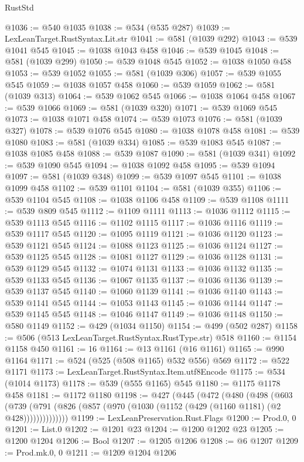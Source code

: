 \begin{lexlean}{RustStd}
\begin{coremodule}
@1036 := @540 @1035
@1038 := @534 (@535 @287)
@1039 := LexLeanTarget.RustSyntax.Lit.str
@1041 := @581 (@1039 @292)
@1043 := @539 @1041 @545
@1045 := @1038 @1043 @458
@1046 := @539 @1045
@1048 := @581 (@1039 @299)
@1050 := @539 @1048 @545
@1052 := @1038 @1050 @458
@1053 := @539 @1052
@1055 := @581 (@1039 @306)
@1057 := @539 @1055 @545
@1059 := @1038 @1057 @458
@1060 := @539 @1059
@1062 := @581 (@1039 @313)
@1064 := @539 @1062 @545
@1066 := @1038 @1064 @458
@1067 := @539 @1066
@1069 := @581 (@1039 @320)
@1071 := @539 @1069 @545
@1073 := @1038 @1071 @458
@1074 := @539 @1073
@1076 := @581 (@1039 @327)
@1078 := @539 @1076 @545
@1080 := @1038 @1078 @458
@1081 := @539 @1080
@1083 := @581 (@1039 @334)
@1085 := @539 @1083 @545
@1087 := @1038 @1085 @458
@1088 := @539 @1087
@1090 := @581 (@1039 @341)
@1092 := @539 @1090 @545
@1094 := @1038 @1092 @458
@1095 := @539 @1094
@1097 := @581 (@1039 @348)
@1099 := @539 @1097 @545
@1101 := @1038 @1099 @458
@1102 := @539 @1101
@1104 := @581 (@1039 @355)
@1106 := @539 @1104 @545
@1108 := @1038 @1106 @458
@1109 := @539 @1108
@1111 := @539 @809 @545
@1112 := @1109 @1111
@1113 := @1036 @1112
@1115 := @539 @1113 @545
@1116 := @1102 @1115
@1117 := @1036 @1116
@1119 := @539 @1117 @545
@1120 := @1095 @1119
@1121 := @1036 @1120
@1123 := @539 @1121 @545
@1124 := @1088 @1123
@1125 := @1036 @1124
@1127 := @539 @1125 @545
@1128 := @1081 @1127
@1129 := @1036 @1128
@1131 := @539 @1129 @545
@1132 := @1074 @1131
@1133 := @1036 @1132
@1135 := @539 @1133 @545
@1136 := @1067 @1135
@1137 := @1036 @1136
@1139 := @539 @1137 @545
@1140 := @1060 @1139
@1141 := @1036 @1140
@1143 := @539 @1141 @545
@1144 := @1053 @1143
@1145 := @1036 @1144
@1147 := @539 @1145 @545
@1148 := @1046 @1147
@1149 := @1036 @1148
@1150 := @580 @1149
@1152 := @429 (@1034 @1150)
@1154 := @499 (@502 @287)
@1158 := @506 (@513 LexLeanTarget.RustSyntax.RustType.str) @518
@1160 := @1154 @1158 @450
@1161 := 16
@1164 := @13 @1161 (@16 @1161)
@1165 := @990 @1164
@1171 := @524 (@525 (@508 @1165) @532 @556) @569
@1172 := @522 @1171
@1173 := LexLeanTarget.RustSyntax.Item.utf8Encode
@1175 := @534 (@1014 @1173)
@1178 := @539 (@555 @1165) @545
@1180 := @1175 @1178 @458
@1181 := @1172 @1180
@1198 := @427
    (@445
      (@472
        (@480
          (@498
            (@603
              (@739 (@791 (@826 (@857 (@970 (@1030 (@1152 (@429 (@1160 @1181) (@2 @428))))))))))))))
@1199 := LexLeanPreservation.Rust.Flags
@1200 := Prod.{0, 0}
@1201 := List.{0}
@1202 := @1201 @23
@1204 := @1200 @1202 @23
@1205 := @1200 @1204
@1206 := Bool
@1207 := @1205 @1206
@1208 := @6 @1207
@1209 := Prod.mk.{0, 0}
@1211 := @1209 @1204 @1206

\end{coremodule}
\end{lexlean}

